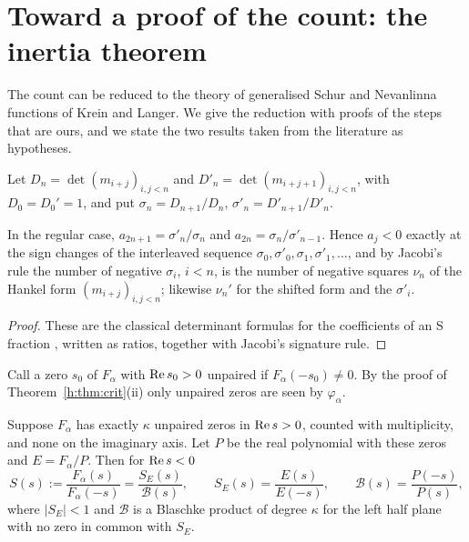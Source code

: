 \section{Toward a proof of the count: the inertia theorem}\label{h:sec:inertia}

The count can be reduced to the theory of generalised Schur and Nevanlinna functions of Krein and Langer. We give the reduction with proofs of the steps that are ours, and we state the two results taken from the literature as hypotheses.

Let $D_n=\det(m_{i+j})_{i,j<n}$ and $D'_n=\det(m_{i+j+1})_{i,j<n}$, with $D_0=D_0'=1$, and put $\sigma_n=D_{n+1}/D_n$, $\sigma'_n=D'_{n+1}/D'_n$.

\begin{lemma}\label{h:lem:ratios}
In the regular case, $a_{2n+1}=\sigma'_n/\sigma_n$ and $a_{2n}=\sigma_n/\sigma'_{n-1}$. Hence $a_j<0$ exactly at the sign changes of the interleaved sequence $\sigma_0,\sigma'_0,\sigma_1,\sigma'_1,\dots$, and by Jacobi's rule the number of negative $\sigma_i$, $i<n$, is the number of negative squares $\nu_n$ of the Hankel form $(m_{i+j})_{i,j<n}$; likewise $\nu_n'$ for the shifted form and the $\sigma'_i$.
\end{lemma}

\begin{proof}
These are the classical determinant formulas for the coefficients of an S fraction \cite{Stieltjes94}, written as ratios, together with Jacobi's signature rule.
\end{proof}

Call a zero $s_0$ of $F_\alpha$ with $\operatorname{Re} s_0>0$ unpaired if $F_\alpha(-s_0)\ne0$. By the proof of Theorem~\ref{h:thm:crit}(ii) only unpaired zeros are seen by $\varphi_\alpha$.

\begin{lemma}\label{h:lem:blaschke}
Suppose $F_\alpha$ has exactly $\kappa$ unpaired zeros in $\operatorname{Re} s>0$, counted with multiplicity, and none on the imaginary axis. Let $P$ be the real polynomial with these zeros and $E=F_\alpha/P$. Then for $\operatorname{Re} s<0$
\[
S(s):=\frac{F_\alpha(s)}{F_\alpha(-s)}=\frac{S_E(s)}{\mathcal B(s)},\qquad S_E(s)=\frac{E(s)}{E(-s)},\qquad \mathcal B(s)=\frac{P(-s)}{P(s)},
\]
where $|S_E|<1$ and $\mathcal B$ is a Blaschke product of degree $\kappa$ for the left half plane with no zero in common with $S_E$.
\end{lemma}

